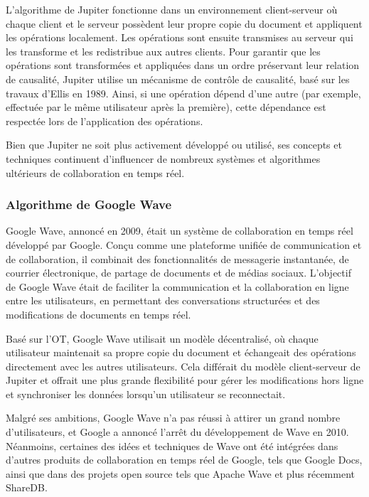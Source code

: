 L'algorithme de Jupiter fonctionne dans un environnement client-serveur où chaque client et le serveur possèdent leur propre copie du document et appliquent les opérations localement\cite{jupiter}. Les opérations sont ensuite transmises au serveur qui les transforme et les redistribue aux autres clients. Pour garantir que les opérations sont transformées et appliquées dans un ordre préservant leur relation de causalité, Jupiter utilise un mécanisme de contrôle de causalité, basé sur les travaux d'Ellis en 1989\cite{ellis1989}. Ainsi, si une opération dépend d'une autre (par exemple, effectuée par le même utilisateur après la première), cette dépendance est respectée lors de l'application des opérations.

Bien que Jupiter ne soit plus activement développé ou utilisé, ses concepts et techniques continuent d'influencer de nombreux systèmes et algorithmes ultérieurs de collaboration en temps réel.

\subsubsection{Algorithme de Google Wave}

Google Wave, annoncé en 2009, était un système de collaboration en temps réel développé par Google\cite{googlewave}. Conçu comme une plateforme unifiée de communication et de collaboration, il combinait des fonctionnalités de messagerie instantanée, de courrier électronique, de partage de documents et de médias sociaux. L'objectif de Google Wave était de faciliter la communication et la collaboration en ligne entre les utilisateurs, en permettant des conversations structurées et des modifications de documents en temps réel\cite{googlewave}.

Basé sur l'OT, Google Wave utilisait un modèle décentralisé, où chaque utilisateur maintenait sa propre copie du document et échangeait des opérations directement avec les autres utilisateurs. Cela différait du modèle client-serveur de Jupiter et offrait une plus grande flexibilité pour gérer les modifications hors ligne et synchroniser les données lorsqu'un utilisateur se reconnectait.

Malgré ses ambitions, Google Wave n'a pas réussi à attirer un grand nombre d'utilisateurs, et Google a annoncé l'arrêt du développement de Wave en 2010\cite{googlewaveend}. Néanmoins, certaines des idées et techniques de Wave ont été intégrées dans d'autres produits de collaboration en temps réel de Google, tels que Google Docs, ainsi que dans des projets open source tels que Apache Wave et plus récemment ShareDB\cite{apachewave, sharedb}.

